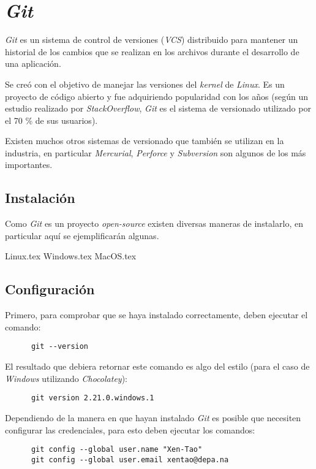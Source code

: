 \chapter{\textit{Git}}
  \textit{Git} es un sistema de control de versiones (\textit{VCS}) distribuido para 
  mantener un historial de los cambios que se realizan en los archivos durante el 
  desarrollo de una aplicación.

  Se creó con el objetivo de manejar las versiones del \textit{kernel} de \textit{Linux}.
  Es un proyecto de código abierto y fue adquiriendo popularidad con los años (según un 
  estudio realizado por \textit{StackOverflow}, \textit{Git} es el sistema de 
  versionado utilizado por el 70 \% de sus usuarios).
  
  Existen muchos otros sistemas de versionado que también se utilizan en la industria,
  en particular \textit{Mercurial}, \textit{Perforce} y \textit{Subversion} son algunos de 
  los más importantes.
  
  \section{Instalación}
    Como \textit{Git} es un proyecto \textit{open-source} existen diversas maneras de 
    instalarlo, en particular aquí se ejemplificarán algunas.

    {Linux.tex}
    {Windows.tex}
    {MacOS.tex}

  \section{Configuración}
    Primero, para comprobar que se haya instalado correctamente, deben ejecutar el comando:
    \begin{verbatim}
      git --version
    \end{verbatim}

    El resultado que debiera retornar este comando es algo del estilo (para el caso de 
    \textit{Windows} utilizando \textit{Chocolatey}):

    \begin{verbatim}
      git version 2.21.0.windows.1
    \end{verbatim}

    Dependiendo de la manera en que hayan instalado \textit{Git} es posible que 
    necesiten configurar las credenciales, para esto deben ejecutar los comandos:
    \begin{verbatim}
      git config --global user.name "Xen-Tao"
      git config --global user.email xentao@depa.na
    \end{verbatim}


